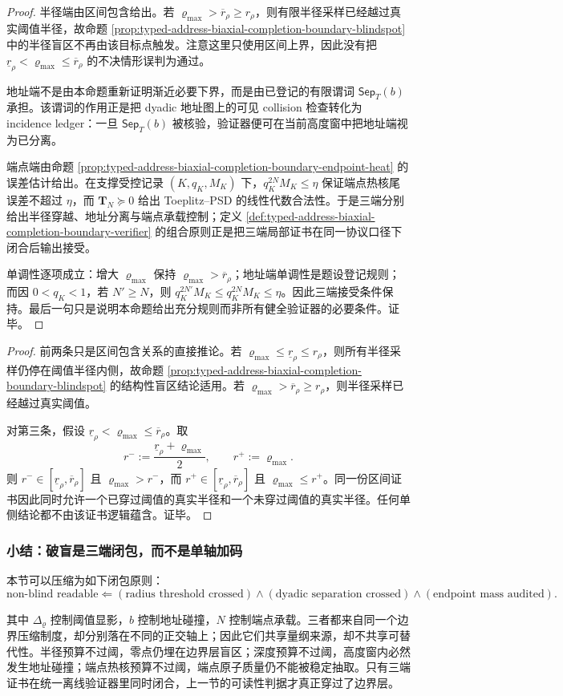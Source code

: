 \begin{proof}
半径端由区间包含给出。若 \(\varrho_{\max}>\overline r_\rho\ge r_\rho\)，则有限半径采样已经越过真实阈值半径，故命题 \ref{prop:typed-address-biaxial-completion-boundary-blindspot} 中的半径盲区不再由该目标点触发。注意这里只使用区间上界，因此没有把 \(\underline r_\rho<\varrho_{\max}\le\overline r_\rho\) 的不决情形误判为通过。

地址端不是由本命题重新证明渐近必要下界，而是由已登记的有限谓词 \(\mathsf{Sep}_T(b)\) 承担。该谓词的作用正是把 dyadic 地址图上的可见 collision 检查转化为 incidence ledger：一旦 \(\mathsf{Sep}_T(b)\) 被核验，验证器便可在当前高度窗中把地址端视为已分离。

端点端由命题 \ref{prop:typed-address-biaxial-completion-boundary-endpoint-heat} 的误差估计给出。在支撑受控记录 \((K,q_K,M_K)\) 下，\(q_K^{2N}M_K\le\eta\) 保证端点热核尾误差不超过 \(\eta\)，而 \(\mathbf T_N\succeq0\) 给出 Toeplitz--PSD 的线性代数合法性。于是三端分别给出半径穿越、地址分离与端点承载控制；定义 \ref{def:typed-address-biaxial-completion-boundary-verifier} 的组合原则正是把三端局部证书在同一协议口径下闭合后输出接受。

单调性逐项成立：增大 \(\varrho_{\max}\) 保持 \(\varrho_{\max}>\overline r_\rho\)；地址端单调性是题设登记规则；而因 \(0<q_K<1\)，若 \(N'\ge N\)，则 \(q_K^{2N'}M_K\le q_K^{2N}M_K\le\eta\)。因此三端接受条件保持。最后一句只是说明本命题给出充分规则而非所有健全验证器的必要条件。证毕。
\end{proof}

\begin{proof}
前两条只是区间包含关系的直接推论。若 \(\varrho_{\max}\le\underline r_\rho\le r_\rho\)，则所有半径采样仍停在阈值半径内侧，故命题 \ref{prop:typed-address-biaxial-completion-boundary-blindspot} 的结构性盲区结论适用。若 \(\varrho_{\max}>\overline r_\rho\ge r_\rho\)，则半径采样已经越过真实阈值。

对第三条，假设 \(\underline r_\rho<\varrho_{\max}\le\overline r_\rho\)。取
\[
r^-:=\frac{\underline r_\rho+\varrho_{\max}}2,
\qquad
r^+:=\varrho_{\max}.
\]
则 \(r^-\in[\underline r_\rho,\overline r_\rho]\) 且 \(\varrho_{\max}>r^-\)，而 \(r^+\in[\underline r_\rho,\overline r_\rho]\) 且 \(\varrho_{\max}\le r^+\)。同一份区间证书因此同时允许一个已穿过阈值的真实半径和一个未穿过阈值的真实半径。任何单侧结论都不由该证书逻辑蕴含。证毕。
\end{proof}

\subsubsection{小结：破盲是三端闭包，而不是单轴加码}\label{subsubsec:typed-address-biaxial-completion-boundary-summary}
本节可以压缩为如下闭包原则：
\[
\text{non-blind readable}
\Longleftarrow
(\text{radius threshold crossed})
\wedge
(\text{dyadic separation crossed})
\wedge
(\text{endpoint mass audited}).
\]

其中 \(\Delta_{\varrho}\) 控制阈值显影，\(b\) 控制地址碰撞，\(N\) 控制端点承载。三者都来自同一个边界压缩制度，却分别落在不同的正交轴上；因此它们共享量纲来源，却不共享可替代性。半径预算不过阈，零点仍埋在边界层盲区；深度预算不过阈，高度窗内必然发生地址碰撞；端点热核预算不过阈，端点原子质量仍不能被稳定抽取。只有三端证书在统一离线验证器里同时闭合，上一节的可读性判据才真正穿过了边界层。
